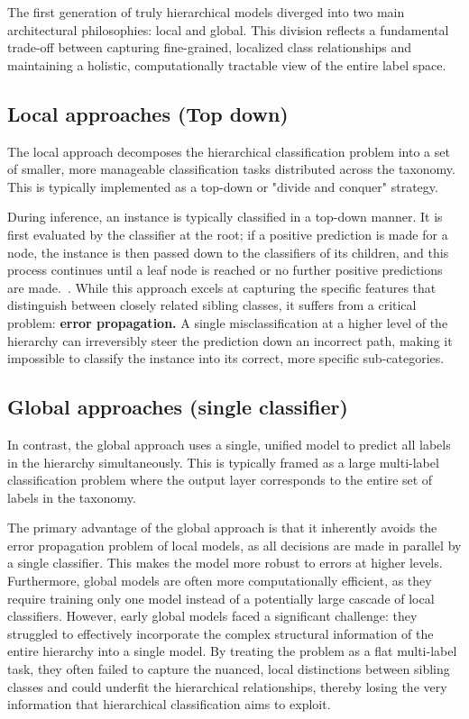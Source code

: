 The first generation of truly hierarchical models diverged into two main architectural philosophies: local and global. This division reflects a fundamental trade-off between capturing fine-grained, localized class relationships and maintaining a holistic, computationally tractable view of the entire label space.

\subsection{Local approaches (Top down)}
The local approach decomposes the hierarchical classification problem into a set of smaller, more manageable classification tasks distributed across the taxonomy. This is typically implemented as a top-down or "divide and conquer" strategy.

During inference, an instance is typically classified in a top-down manner. It is first evaluated by the classifier at the root; if a positive prediction is made for a node, the instance is then passed down to the classifiers of its children, and this process continues until a leaf node is reached or no further positive predictions are made.~\cite{Romero2022}. While this approach excels at capturing the specific features that distinguish between closely related sibling classes, it suffers from a critical problem: \textbf{error propagation.} A single misclassification at a higher level of the hierarchy can irreversibly steer the prediction down an incorrect path, making it impossible to classify the instance into its correct, more specific sub-categories.~\cite{Wehrmann2018}

\subsection{Global approaches (single classifier)}
In contrast, the global approach uses a single, unified model to predict all labels in the hierarchy simultaneously. This is typically framed as a large multi-label classification problem where the output layer corresponds to the entire set of labels in the taxonomy.~\cite{Wehrmann2018}

The primary advantage of the global approach is that it inherently avoids the error propagation problem of local models, as all decisions are made in parallel by a single classifier. This makes the model more robust to errors at higher levels. Furthermore, global models are often more computationally efficient, as they require training only one model instead of a potentially large cascade of local classifiers. However, early global models faced a significant challenge: they struggled to effectively incorporate the complex structural information of the entire hierarchy into a single model. By treating the problem as a flat multi-label task, they often failed to capture the nuanced, local distinctions between sibling classes and could underfit the hierarchical relationships, thereby losing the very information that hierarchical classification aims to exploit.~\cite{Wehrmann2018, zhou-etal-2020-hierarchy}

